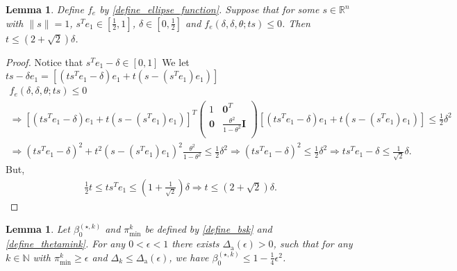 \documentclass{article}
\newtheorem{lemma}[theorem]{Lemma}
\theoremstyle{case}
\numberwithin{theorem}{subsection}
\newcommand{\bsk}{{\beta_0^{(\star, k)}}}
\newcommand{\dacco}{{\Delta_{\textrm{a}}}}
\newcommand{\dk}{\Delta_k}
\newcommand{\fcki}{{C^{(k)}_{\textrm{in}}}}
\newcommand{\naturals}{\mathbb N}
\newcommand{\Rn}{\mathbb R^n}
\newcommand{\thetamink}{{\pi^k_{\textrm{min}}}}
\begin{document}
\begin{lemma}
\label{ellipse_fits_part_2}
Define $f_e$ by \cref{define_ellipse_function}.
Suppose that for some $s \in \Rn$ with $\|s\| = 1$, $s^Te_1 \in \left[\frac 1 2, 1\right]$, $\delta \in [0, \frac 1 2]$ and $f_e(\delta, \delta, \theta; ts) \le 0$.
Then $t \le \left(2 + \sqrt{2}\right) \delta$.
\end{lemma}
\begin{proof}
Notice that $s^Te_1 - \delta \in \left[0, 1\right]$
We let $ts - \delta e_1= \left[\left(ts^Te_1 - \delta\right) e_1 + t\left(s - \left(s^Te_1\right) e_1\right)\right]$
\begin{align*}
f_e(\delta, \delta, \theta; ts) \le 0 \\
\Longrightarrow 
\left[\left(ts^Te_1 - \delta\right) e_1 + t\left(s - \left(s^Te_1\right) e_1\right)\right]^T\begin{pmatrix}
1 & \boldsymbol0^T \\
\boldsymbol 0 & \frac{\theta^2}{1 - \theta^2} \boldsymbol I \\
\end{pmatrix}\left[\left(ts^Te_1 - \delta\right) e_1 + t\left(s - \left(s^Te_1\right) e_1\right)\right] \le \frac 1 2 \delta^2 \\
\Longrightarrow
\left(ts^Te_1 - \delta\right)^2 + t^2\left(s - \left(s^Te_1\right) e_1\right)^2  \frac{\theta^2}{1 - \theta^2} \le \frac 1 2 \delta^2
\Longrightarrow 
\left(t s^Te_1 - \delta\right)^2 \le \frac 1 2 \delta^2 
\Longrightarrow t s^Te_1 - \delta \le \frac 1 {\sqrt{2}} \delta.
\end{align*}
But,
\begin{align*}
\frac 1 2 t \le t s^Te_1 \le \left(1 + \frac 1 {\sqrt{2}}\right) \delta
\Longrightarrow t \le \left(2 + \sqrt{2}\right) \delta.
\end{align*}
\end{proof}




\begin{lemma}
\label{boundbsk}
Let $\bsk$ and $\thetamink$ be defined by \cref{define_bsk} and \cref{define_thetamink}.
For any $0 < \epsilon < 1$ there exists $\dacco(\epsilon) > 0$, such that for any $k \in \naturals$ with
$\thetamink \ge \epsilon$ and $\dk \le \dacco(\epsilon)$, we have
$\bsk \le 1 - \frac 1 4 \epsilon^2$.
\end{lemma}
\end{document}
